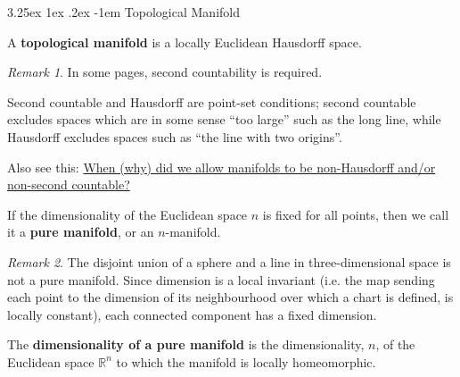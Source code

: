 \documentclass[12pt, letterpaper]{article}
\makeatletter
\newcommand{\re}{\mathbb{R}}
\newtheorem{cor}[prop]{Corollary}
\newtheorem{thm}[prop]{Theorem}
\renewcommand\paragraph{\@startsection{paragraph}{4}{\z@}%
	{3.25ex \@plus1ex \@minus.2ex}%
	{-1em}%
	{\normalfont\normalsize\bfseries}}
\theoremstyle{definition}
\theoremstyle{remark}
\newtheorem*{rem*}{Remark}
\theoremstyle{definition}
\theoremstyle{plain}
\numberwithin{equation}{section}
\makeatother
\begin{document}
	
	\paragraph{Topological Manifold}
	\begin{def*}
		A \textbf{topological manifold} is a locally Euclidean Hausdorff space. 
	\end{def*}
	\begin{rem*}
		In some pages, second countability is required.
		
		Second countable and Hausdorff are point-set conditions;
		second countable excludes spaces which are in some sense ``too large'' such as the long line,
		while Hausdorff excludes spaces such as ``the line with two origins''.
		
		Also see this:
		\href{https://mathoverflow.net/questions/362154/when-why-did-we-allow-manifolds-to-be-non-hausdorff-and-or-non-second-countabl}{When (why) did we allow manifolds to be non-Hausdorff and/or non-second countable?}
	\end{rem*}

	
	\begin{def*}
		If the dimensionality of the Euclidean space $n$ is fixed for all points,
		then we call it a \textbf{pure manifold}, or an $n$-manifold.
	\end{def*}
	\begin{rem*}
		The disjoint union of a sphere and a line in three-dimensional space is not a pure manifold.
		Since dimension is a local invariant (i.e. the map sending each point to the dimension of its neighbourhood over which a chart is defined, is locally constant), each connected component has a fixed dimension.
	\end{rem*}
	\begin{def*}
		The \textbf{dimensionality of a pure manifold} is the dimensionality, $n$, of the Euclidean space $\re^n$
		to which the manifold is locally homeomorphic.
	\end{def*}

\end{document}
